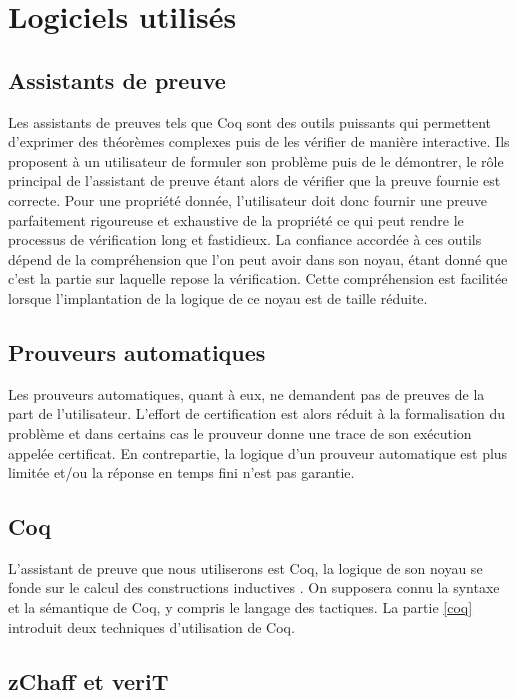 \documentclass[11pt]{article}
\begin{document}
\newpage
\section{Logiciels utilisés}

\subsection{Assistants de preuve}\label{assistants}

Les assistants de preuves tels que Coq sont des outils puissants qui permettent d'exprimer des théorèmes complexes puis de les vérifier de manière interactive. Ils proposent à un utilisateur de formuler son problème puis de le démontrer, le rôle principal de l'assistant de preuve étant alors de vérifier que la preuve fournie est correcte. Pour une propriété donnée, l'utilisateur doit donc fournir une preuve parfaitement rigoureuse et exhaustive de la propriété ce qui peut rendre le processus de vérification long et fastidieux. La confiance accordée à ces outils dépend de la compréhension que l'on peut avoir dans son noyau, étant donné que c'est la partie sur laquelle repose la vérification. Cette compréhension est facilitée lorsque l'implantation de la logique de ce noyau est de taille réduite. 

\subsection{Prouveurs automatiques}\label{prouveurs}

Les prouveurs automatiques, quant à eux, ne demandent pas de preuves de la part de l'utilisateur. L'effort de certification est alors réduit à la formalisation du problème et dans certains cas le prouveur donne une trace de son exécution appelée certificat. En contrepartie, la logique d'un prouveur automatique est plus limitée et/ou la réponse en temps fini n'est pas garantie.

\subsection{Coq}

L'assistant de preuve que nous utiliserons est Coq, la logique de son noyau se fonde sur le calcul des constructions inductives \cite{coq_intro}. 
On supposera connu la syntaxe et la sémantique de Coq, y compris le langage des tactiques. La partie \ref{coq} introduit deux techniques d'utilisation de Coq.

\subsection{zChaff et veriT}
\end{document}
